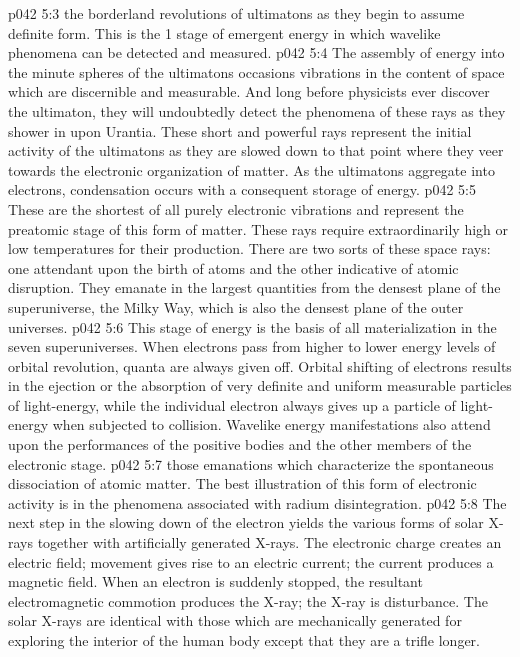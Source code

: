 \vs p042 5:3 \bibnobreakspace {} the borderland revolutions of ultimatons as they begin to assume definite form. This is the 1 stage of emergent energy in which wavelike phenomena can be detected and measured.
\vs p042 5:4 \bibnobreakspace {} The assembly of energy into the minute spheres of the ultimatons occasions vibrations in the content of space which are discernible and measurable. And long before physicists ever discover the ultimaton, they will undoubtedly detect the phenomena of these rays as they shower in upon Urantia. These short and powerful rays represent the initial activity of the ultimatons as they are slowed down to that point where they veer towards the electronic organization of matter. As the ultimatons aggregate into electrons, condensation occurs with a consequent storage of energy.
\vs p042 5:5 \bibnobreakspace {} These are the shortest of all purely electronic vibrations and represent the preatomic stage of this form of matter. These rays require extraordinarily high or low temperatures for their production. There are two sorts of these space rays: one attendant upon the birth of atoms and the other indicative of atomic disruption. They emanate in the largest quantities from the densest plane of the superuniverse, the Milky Way, which is also the densest plane of the outer universes.
\vs p042 5:6 \bibnobreakspace {} This stage of energy is the basis of all materialization in the seven superuniverses. When electrons pass from higher to lower energy levels of orbital revolution, quanta are always given off. Orbital shifting of electrons results in the ejection or the absorption of very definite and uniform measurable particles of light\hyp{}energy, while the individual electron always gives up a particle of light\hyp{}energy when subjected to collision. Wavelike energy manifestations also attend upon the performances of the positive bodies and the other members of the electronic stage.
\vs p042 5:7 \bibnobreakspace {} those emanations which characterize the spontaneous dissociation of atomic matter. The best illustration of this form of electronic activity is in the phenomena associated with radium disintegration.
\vs p042 5:8 \bibnobreakspace {} The next step in the slowing down of the electron yields the various forms of solar X\hyp{}rays together with artificially generated X\hyp{}rays. The electronic charge creates an electric field; movement gives rise to an electric current; the current produces a magnetic field. When an electron is suddenly stopped, the resultant electromagnetic commotion produces the X\hyp{}ray; the X\hyp{}ray is  disturbance. The solar X\hyp{}rays are identical with those which are mechanically generated for exploring the interior of the human body except that they are a trifle longer.
